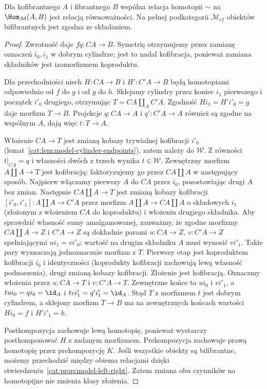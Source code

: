 \begin{stwierdzenie}\label{cat:prop:model-homotopy-congruence}
Dla kofibrantnego $A$ i fibrantnego $B$ wspólna relacja homotopii $\sim$ na $\Hom_{\mathcal M}(A,B)$ jest relacją równoważności. Na pełnej podkategorii $\mathcal M_{cf}$ obiektów bifibrantnych jest zgodna ze składaniem.
\end{stwierdzenie}
\begin{proof}
Zwrotność daje $fq:CA\to B$. Symetrię otrzymujemy przez zamianę oznaczeń $i_0,i_1$ w dobrym cylindrze; jest to nadal kofibracja, ponieważ zamiana składników jest izomorfizmem koproduktu.

Dla przechodniości niech $H:CA\to B$ i $H':C'A\to B$ będą homotopiami odpowiednio od $f$ do $g$ i od $g$ do $h$. Sklejamy cylindry przez koniec $i_1$ pierwszego i początek $i'_0$ drugiego, otrzymując $T=CA\amalg_A C'A$. Zgodność $Hi_1=H'i'_0=g$ daje morfizm $T\to B$. Projekcje $q:CA\to A$ i $q':C'A\to A$ również są zgodne na wspólnym $A$, dają więc $t:T\to A$.

Włożenie $CA\to T$ jest zmianą kobazy trywialnej kofibracji $i'_0$ (lemat~\ref{cat:lem:model-cylinder-endpoints}), zatem należy do $\mathcal W$. Z równości $t|_{CA}=q$ i własności dwóch z trzech wynika $t\in\mathcal W$. Zewnętrzny morfizm $A\amalg A\to T$ jest kofibracją: faktoryzujemy go przez $CA\amalg A$ w następujący sposób. Najpierw włączamy pierwszy $A$ do $CA$ przez $i_0$, pozostawiając drugi $A$ bez zmian. Następnie $CA\amalg A\to T$ jest zmianą kobazy kofibracji $[i'_0,i'_1]:A\amalg A\to C'A$ przez morfizm $A\amalg A\to CA\amalg A$ o składowych $i_1$ (złożonym z włożeniem $CA$ do koproduktu) i włożeniu drugiego składnika. Aby sprawdzić własność sumy amalgamowanej, zauważmy, że zgodne morfizmy $CA\amalg A\to Z$ i $C'A\to Z$ są dokładnie parami $u:CA\to Z$, $v:C'A\to Z$ spełniającymi $ui_1=vi'_0$: wartość na drugim składniku $A$ musi wynosić $vi'_1$. Takie pary wyznaczają jednoznacznie morfizm z $T$. Pierwszy etap jest koproduktem kofibracji $i_0$ i identyczności (koprodukty kofibracji zachowują lewą własność podnoszenia), drugi zmianą kobazy kofibracji. Złożenie jest kofibracją. Oznaczmy włożenia przez $u:CA\to T$ i $v:C'A\to T$. Zewnętrzne końce to $ui_0$ i $vi'_1$, a $tui_0=qi_0=\id_A$ i $tvi'_1=q'i'_1=\id_A$. Stąd $T$ z morfizmem $t$ jest dobrym cylindrem, a sklejony morfizm $T\to B$ ma na zewnętrznych końcach wartości $Hi_0=f$ i $H'i'_1=h$.

Postkompozycja zachowuje lewą homotopię, ponieważ wystarczy postkomponować $H$ z zadanym morfizmem. Prekompozycja zachowuje prawą homotopię przez prekompozycję $K$. Jeśli wszystkie obiekty są bifibrantne, możemy przechodzić między obiema relacjami dzięki stwierdzeniu~\ref{cat:prop:model-left-right}. Zatem zmiana obu czynników na homotopijne nie zmienia klasy złożenia.
\end{proof}

